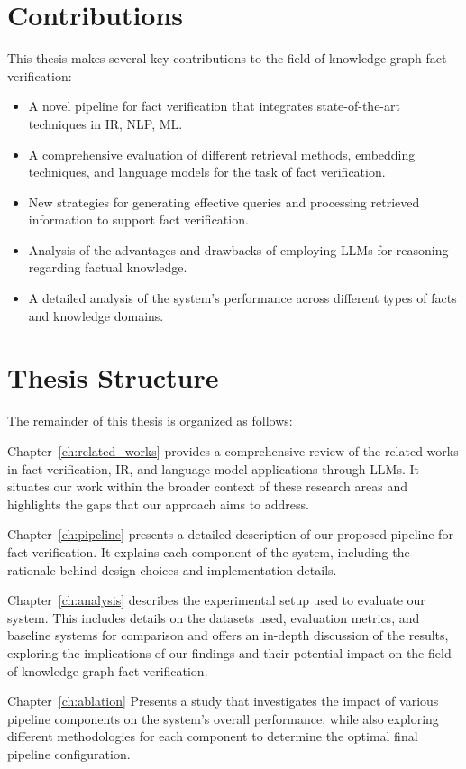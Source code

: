 \section{Contributions}\label{sec:contributions}
This thesis makes several key contributions to the field of knowledge graph fact verification:
\begin{itemize}
    \item A novel pipeline for fact verification that integrates state-of-the-art techniques in \ac{IR}, \ac{NLP}, \ac{ML}.
    \item A comprehensive evaluation of different retrieval methods, embedding techniques, and language models for the task of fact verification.
    \item New strategies for generating effective queries and processing retrieved information to support fact verification.
    \item Analysis of the advantages and drawbacks of employing \ac{LLMs} for reasoning regarding factual knowledge.
    \item A detailed analysis of the system's performance across different types of facts and knowledge domains.
\end{itemize}

\section{Thesis Structure}\label{sec:structure}
The remainder of this thesis is organized as follows:

Chapter~\ref{ch:related_works} provides a comprehensive review of the related works in fact verification, \ac{IR}, and language model applications through \ac{LLMs}.
It situates our work within the broader context of these research areas and highlights the gaps that our approach aims to address.

Chapter~\ref{ch:pipeline} presents a detailed description of our proposed pipeline for fact verification.
It explains each component of the system, including the rationale behind design choices and implementation details.

Chapter~\ref{ch:analysis} describes the experimental setup used to evaluate our system.
This includes details on the datasets used, evaluation metrics, and baseline systems for comparison and offers an in-depth discussion of the results, exploring the implications of our findings and their potential impact on the field of knowledge graph fact verification.

Chapter~\ref{ch:ablation} Presents a study that investigates the impact of various pipeline components on the system's overall performance, while also exploring different methodologies for each component to determine the optimal final pipeline configuration.

